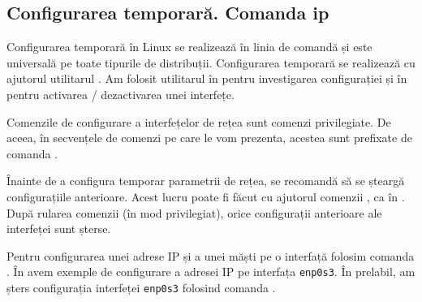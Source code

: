 \subsection{Configurarea temporară. Comanda ip}
\label{sec:net:linux-config:temporary}

Configurarea temporară în Linux se realizează în linia de comandă și este universală pe toate tipurile de distribuții.
Configurarea temporară se realizează cu ajutorul utilitarul .
Am folosit utilitarul  în  pentru investigarea configurației și în  pentru activarea / dezactivarea unei interfețe.

Comenzile de configurare a interfețelor de rețea sunt comenzi privilegiate.
De aceea, în secvențele de comenzi pe care le vom prezenta, acestea sunt prefixate de comanda .

Înainte de a configura temporar parametrii de rețea, se recomandă să se șteargă configurațiile anterioare.
Acest lucru poate fi făcut cu ajutorul comenzii , ca în .
După rularea comenzii  (în mod privilegiat), orice configurații anterioare ale interfeței sunt șterse.


Pentru configurarea unei adrese IP și a unei măști pe o interfață folosim comanda .
În  avem exemple de configurare a adresei IP  pe interfața \texttt{enp0s3}.
În prelabil, am șters configurația interfeței \texttt{enp0s3} folosind comanda .

